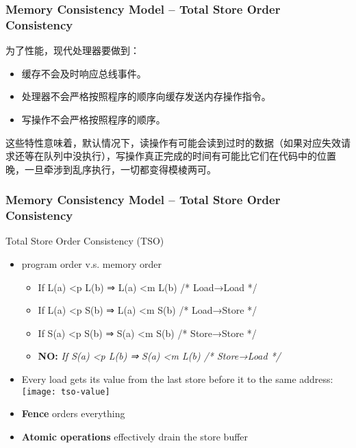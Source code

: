 \begin{frame}[plain]	
    \frametitle{Memory Consistency Model --  Total Store Order  Consistency}
    为了性能，现代处理器要做到：
    \begin{itemize}
        \item 缓存不会及时响应总线事件。
        \item 处理器不会严格按照程序的顺序向缓存发送内存操作指令。
        \item 写操作不会严格按照程序的顺序。
    \end{itemize}
这些特性意味着，默认情况下，读操作有可能会读到过时的数据（如果对应失效请求还等在队列中没执行），写操作真正完成的时间有可能比它们在代码中的位置晚，一旦牵涉到乱序执行，一切都变得模棱两可。


\end{frame}

\begin{frame}[plain]	
    \frametitle{Memory Consistency Model --  Total Store Order  Consistency}
    
    
    Total Store Order  Consistency (TSO)
   \begin{itemize}
   \item program order v.s. memory order
\begin{itemize}
    \item If L(a) <p L(b) ⇒ L(a) <m L(b) /* Load→Load */
    \item If L(a) <p S(b) ⇒ L(a) <m S(b) /* Load→Store */
    \item If S(a) <p S(b) ⇒ S(a) <m S(b) /* Store→Store */ 
    \item \textbf{NO:} \textit{If S(a) <p L(b) ⇒ S(a) <m L(b) /* Store→Load */}
\end{itemize}
    \item Every load gets its value from the last store before it to the same address:
    \texttt{[image: tso-value]}
    
    \item \textbf{Fence} orders everything
    \item \textbf{Atomic operations} effectively drain the store buffer
    
\end{itemize}
    
\end{frame}




